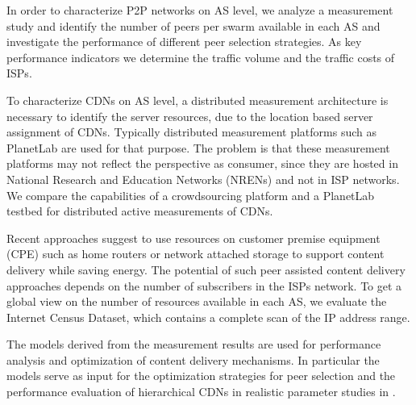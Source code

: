 In order to characterize P2P networks on AS level,
we analyze a measurement study and identify the number of peers per swarm available in each AS and investigate the performance of different peer selection strategies.
As key performance indicators we determine the traffic volume and the traffic costs of ISPs.

To characterize CDNs on AS level, a distributed measurement architecture is necessary to identify the server resources, due to the location based server assignment of CDNs.
Typically distributed measurement platforms such as PlanetLab are used for that purpose.
The problem is that these measurement platforms may not reflect the perspective as consumer, since they are hosted in National Research and Education Networks (NRENs) and not in ISP networks.
We compare the capabilities of a crowdsourcing platform and a PlanetLab testbed for distributed active measurements of CDNs.

Recent approaches \cite{valancius2009greening} suggest to use resources on customer premise equipment (CPE) such as home routers or network attached storage to support content delivery while saving energy.
The potential of such peer assisted content delivery approaches depends on the number of subscribers in the ISPs network.
To get a global view on the number of resources available in each AS, we evaluate the Internet Census Dataset, which contains a complete scan of the IP address range.


The models derived from the measurement results are used for performance analysis and optimization of content delivery mechanisms.
In particular the models serve as input for the optimization strategies for peer selection and the performance evaluation of hierarchical CDNs in realistic parameter studies in .

